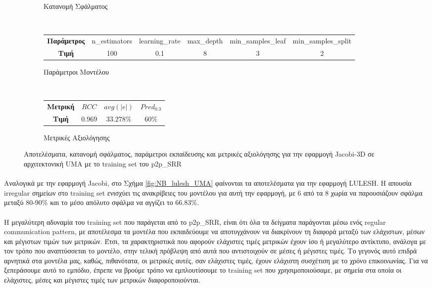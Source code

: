 \begin{figure}[ht]
\begin{subfigure}[b]{0.47\textwidth}
        \caption{Κατανομή Σφάλματος}
        \label{fig:NB_jacobi_UMA_err}
    \end{subfigure} 
    \\[0.2cm]
    \begin{subfigure}[b]{\textwidth}
   	 	\scriptsize
		\begin{tabular}{c||c|c|c|c|c}
			\textbf{Παράμετρος} & n\_estimators & learning\_rate & max\_depth & min\_samples\_leaf & min\_samples\_split \\
			\textbf{Τιμή}       &       100        &  0.1               &  8          &  3                  &    2                 
		\end{tabular}
		\caption{Παράμετροι Μοντέλου}
    \end{subfigure}
    \\[0.2cm]
    \begin{subfigure}[b]{\textwidth}
    		\centering
   	 	\scriptsize
		\begin{tabular}{c||c|c|c}
			\textbf{Μετρική} & $RCC$ &   $avg(|e|)$ & $Pred_{0.3}$  \\
			\textbf{Τιμή}  &  $0.969$   &      $33.278\%
			$        &  $60\%$                                         
		\end{tabular}
		\caption{Μετρικές Αξιολόγησης}
    \end{subfigure}
    
        \caption{Αποτελέσματα, κατανομή σφάλματος, παράμετροι εκπαίδευσης και μετρικές αξιολόγησης για την εφαρμογή Jacobi-3D σε αρχιτεκτονική UMA με το training set του p2p\_SRR}
    \label{fig:NB_jacobi_UMA}
\end{figure}
\paragraph{}
Αναλογικά με την εφαρμογή Jacobi, στο Σχήμα \ref{fig:NB_lulesh_UMA} φαίνονται τα αποτελέσματα για την εφαρμογή LULESH. Η απουσία irregular σημείων στο training set ενισχύει τις ανακρίβειες του μοντέλου για αυτή την εφαρμογή, με 6 από τα 8 χωρία να παρουσιάζουν σφάλμα μεταξύ 80-90\% και το μέσο απόλυτο σφάλμα να αγγίζει το 66.83\%.
\paragraph{}
Η μεγαλύτερη αδυναμία του training set που παράγεται από το p2p\_SRR, είναι ότι όλα τα δείγματα παράγονται μέσω ενός regular communication pattern, με αποτέλεσμα τα μοντέλα που εκπαιδεύουμε να αποτυγχάνουν να διακρίνουν τη διαφορά μεταξύ των ελάχιστων, μέσων και μέγιστων τιμών των μετρικών. Έτσι, τα χαρακτηριστικά που αφορούν ελάχιστες τιμές μετρικών έχουν ίσο ή μεγαλύτερο αντίκτυπο, ανάλογα με τον τρόπο που αναπτύσσεται το μοντέλο, στην τελική πρόβλεψη από αυτά που αντιστοιχούν σε μέσες ή μέγιστες τιμές. Το γεγονός αυτό επιδρά αρνητικά στα μοντέλα μας, καθώς, πιθανότατα, οι μετρικές αυτές, σαν ελάχιστες τιμές, έχουν ελάχιστη συσχέτιση με το χρόνο επικοινωνίας. Για να ξεπεράσουμε αυτό το εμπόδιο, έπρεπε να βρούμε τρόπο να εμπλουτίσουμε το training set που χρησιμοποιούσαμε, με σημεία στα οποία οι ελάχιστες, μέσες και μέγιστες τιμές των μετρικών διαφοροποιούνται. 

